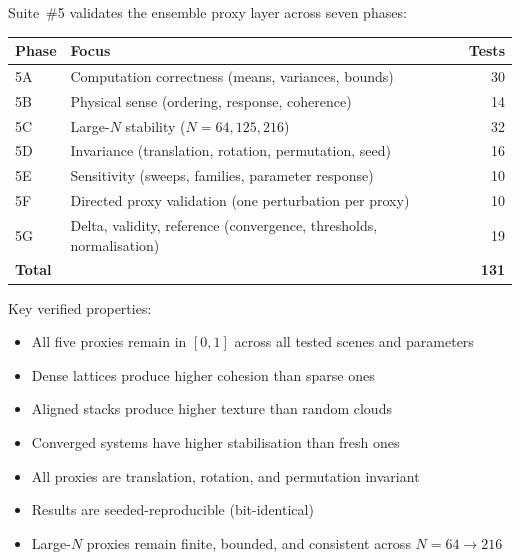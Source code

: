 \documentclass[11pt]{article}
\begin{document}
Suite~\#5 validates the ensemble proxy layer across seven phases:

\begin{center}
\begin{tabular}{llr}
    \textbf{Phase} & \textbf{Focus} & \textbf{Tests} \\
    \midrule
    5A & Computation correctness (means, variances, bounds) & 30 \\
    5B & Physical sense (ordering, response, coherence) & 14 \\
    5C & Large-$N$ stability ($N = 64, 125, 216$) & 32 \\
    5D & Invariance (translation, rotation, permutation, seed) & 16 \\
    5E & Sensitivity (sweeps, families, parameter response) & 10 \\
    5F & Directed proxy validation (one perturbation per proxy) & 10 \\
    5G & Delta, validity, reference (convergence, thresholds, normalisation) & 19 \\
    \midrule
    \textbf{Total} & & \textbf{131} \\
\end{tabular}
\end{center}

Key verified properties:
\begin{itemize}
    \item All five proxies remain in $[0, 1]$ across all tested scenes
          and parameters
    \item Dense lattices produce higher cohesion than sparse ones
    \item Aligned stacks produce higher texture than random clouds
    \item Converged systems have higher stabilisation than fresh ones
    \item All proxies are translation, rotation, and permutation invariant
    \item Results are seeded-reproducible (bit-identical)
    \item Large-$N$ proxies remain finite, bounded, and consistent
          across $N = 64 \to 216$
\end{itemize}
\label{sec:relation}
\end{document}
